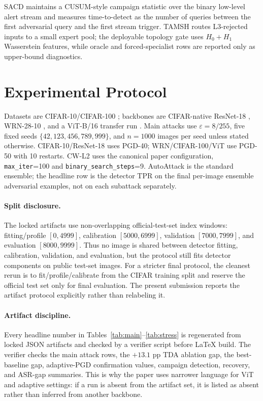 \documentclass{article}
\newcommand{\sacd}{\textsc{SACD}\xspace}
\newcommand{\tamsh}{\textsc{TAMSH}\xspace}
\begin{document}
\sacd maintains a CUSUM-style campaign statistic over the binary low-level alert stream and measures time-to-detect as the number of queries between the first adversarial query and the first stream trigger. \tamsh routes L3-rejected inputs to a small expert pool; the deployable topology gate uses $H_0+H_1$ Wasserstein features, while oracle and forced-specialist rows are reported only as upper-bound diagnostics.

\section{Experimental Protocol}
\label{sec:protocol}
Datasets are CIFAR-10/CIFAR-100 \citep{krizhevsky2009learning}; backbones are CIFAR-native ResNet-18 \citep{he2016deep}, WRN-28-10 \citep{zagoruyko2016wide}, and a ViT-B/16 transfer run \citep{dosovitskiy2021image}. Main attacks use $\varepsilon=8/255$, five fixed seeds $\{42,123,456,789,999\}$, and $n=1000$ images per seed unless stated otherwise. CIFAR-10/ResNet-18 uses PGD-40; WRN/CIFAR-100/ViT use PGD-50 with 10 restarts. CW-L2 uses the canonical paper configuration, \texttt{max\_iter}=100 and \texttt{binary\_search\_steps}=9. AutoAttack is the standard ensemble; the headline row is the detector TPR on the final per-image ensemble adversarial examples, not on each subattack separately.

\paragraph{Split disclosure.}
The locked artifacts use non-overlapping official-test-set index windows: fitting/profile $[0,4999]$, calibration $[5000,6999]$, validation $[7000,7999]$, and evaluation $[8000,9999]$. Thus no image is shared between detector fitting, calibration, validation, and evaluation, but the protocol still fits detector components on public test-set images. For a stricter final protocol, the cleanest rerun is to fit/profile/calibrate from the CIFAR training split and reserve the official test set only for final evaluation. The present submission reports the artifact protocol explicitly rather than relabeling it.

\paragraph{Artifact discipline.}
Every headline number in Tables~\ref{tab:main}--\ref{tab:stress} is regenerated from locked JSON artifacts and checked by a verifier script before LaTeX build. The verifier checks the main attack rows, the $+13.1$ pp TDA ablation gap, the best-baseline gap, adaptive-PGD confirmation values, campaign detection, recovery, and ASR-gap summaries. This is why the paper uses narrower language for ViT and adaptive settings: if a run is absent from the artifact set, it is listed as absent rather than inferred from another backbone.
\end{document}
